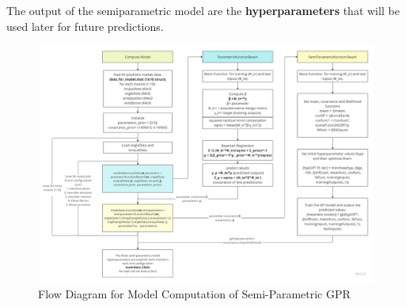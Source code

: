 The output of the semiparametric model are the \textbf{hyperparameters} that will be used later for future predictions.

\newpage
\begin{landscape} %
  \begin{figure}[h!]
    \centering
    \includegraphics[width=1.4\textwidth]{Pictures/Model/computemodel.png} %
    \caption{Flow Diagram for Model Computation of Semi-Parametric GPR} %
    \label{fig:ModelComputationGPR} %
  \end{figure}
\end{landscape} %

